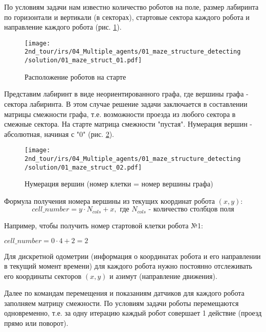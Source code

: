 \solutionSection

По условиям задачи нам известно количество роботов на поле, размер лабиринта по горизонтали и вертикали (в секторах), стартовые сектора каждого робота и направление каждого робота (рис. \ref{fig:01_maze_struct_01}).

\begin{figure}[H]
	\centering
	\texttt{[image: 2nd\_tour/irs/04\_Multiple\_agents/01\_maze\_structure\_detecting/solution/01\_maze\_struct\_01.pdf]}
	\caption{Расположение роботов на старте}
	\label{fig:01_maze_struct_01}
\end{figure}

Представим лабиринт в виде неориентированного графа, где вершины графа - сектора лабиринта. В этом случае решение задачи заключается в составлении матрицы смежности графа, т.е. возможности проезда из любого сектора в смежные сектора. На старте матрица смежности "пустая". Нумерация вершин - абсолютная, начиная с "$0$" (рис. \ref{fig:01_maze_struct_02}).

\begin{figure}[H]
	\centering
	\texttt{[image: 2nd\_tour/irs/04\_Multiple\_agents/01\_maze\_structure\_detecting/solution/01\_maze\_struct\_02.pdf]}
	\caption{Нумерация вершин (номер клетки = номер вершины графа)}
	\label{fig:01_maze_struct_02}
\end{figure}

Формула получения номера вершины из текущих координат робота $(x, y)$:
\begin{equation*}
cell\_number = y \cdot N_{cols} + x, \text{ где } N_{cols} \text{ - количество столбцов поля}
\end{equation*}

Например, чтобы получить номер стартовой клетки робота №1:
\begin{center}
	$cell\_number = 0 \cdot 4 + 2 = 2$
\end{center}

Для дискретной одометрии (информация о координатах робота и его направлении в текущий момент времени) для каждого робота нужно постоянно отслеживать его координаты секторов $(x, y)$ и азимут (направление движения).

Далее по командам перемещения и показаниям датчиков для каждого робота заполняем матрицу смежности. По условиям задачи роботы перемещаются одновременно, т.е. за одну итерацию каждый робот совершает 1 действие (проезд прямо или поворот). 
\\

